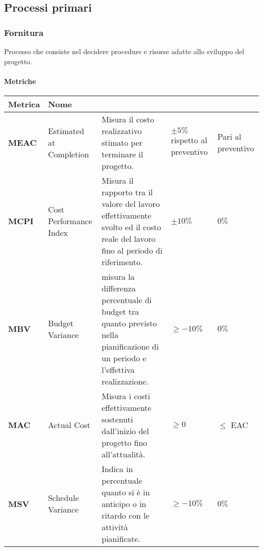 \subsection{Processi primari}
\subsubsection{Fornitura}
Processo che consiste nel decidere procedure e risorse
adatte allo sviluppo del progetto.

\paragraph{Metriche}
\hspace{1pt}
\begin{table}[H]
    \centering
    \begin{tabular}{|C{1.5cm}|L{3cm}|L{4cm}|L{2.5cm}|L{2.5cm}|}
        \hline
        \textbf{Metrica} & \textbf{Nome} & \textbf{} & \textbf{} & \textbf{} \\
        \hline
        \textbf{MEAC} & Estimated at Completion &  Misura il costo realizzativo stimato per terminare il progetto.  & $\pm 5\%$ rispetto al preventivo & Pari al preventivo \\
        \hline
        \textbf{MCPI} & Cost Performance Index & Misura il rapporto tra il valore del lavoro effettivamente svolto ed il 
        costo reale del lavoro fino al periodo di riferimento. & $\pm 10\%$ & $0\%$ \\
        \hline
        \textbf{MBV} & Budget Variance & misura la differenza percentuale di budget tra quanto previsto nella 
        pianificazione di un periodo e l’effettiva realizzazione. & $\geq -10\%$ & $0\%$ \\
        \hline
        \textbf{MAC} & Actual Cost & Misura i costi effettivamente sostenuti dall’inizio del progetto fino 
        all’attualità.
         & $\geq 0 $ & $ \leq$ EAC  \\
        \hline
        \textbf{MSV} & Schedule Variance & Indica in percentuale quanto si è in anticipo o in ritardo con le attività
        pianificate. & $\geq -10\%$ & $0\%$ \\

\end{tabular}
\end{table}
